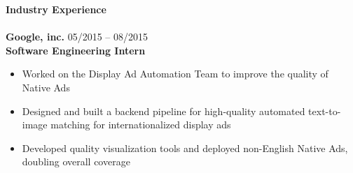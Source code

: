 \documentclass{article}
\begin{document}

\noindent
\textbf{{\Large Industry Experience}}\\[-2mm]
\HRule\\
\textbf{Google, inc.}
\hfill 05/2015 -- 08/2015\\
\textbf{Software Engineering Intern}
\begin{itemize}
\vspace{-1.8mm}
\item Worked on the Display Ad Automation Team to improve the quality of Native Ads
\vspace{-2.5mm}
\item Designed and built a backend pipeline for high-quality automated text-to-image matching for internationalized display ads
\vspace{-2.5mm}
\item Developed quality visualization tools and deployed non-English Native Ads, doubling overall coverage
\end{itemize}
\vspace{1mm}
\end{document}
